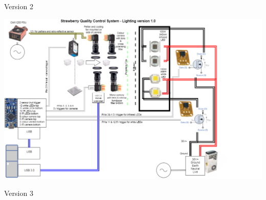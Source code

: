 \documentclass[fleqn,twoside]{article}
\begin{document}
\newpage
Version 2
\begin{minipage}[b]{0.9\linewidth}
	\includegraphics[scale=0.9,angle=270]{appendix/wiring_2.png}
\end{minipage}




\newpage
Version 3
\begin{minipage}[b]{0.9\linewidth}
	
\end{minipage}







\end{document}
